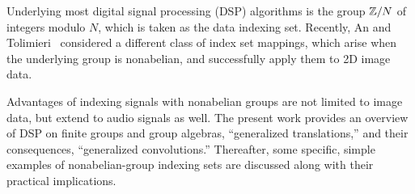 Underlying most digital signal processing (DSP) algorithms
is the group $\mathbb{Z}/N$ of integers modulo $N$, which is
taken as the data indexing set. 
Recently, An and
Tolimieri~\cite{An:2003} considered a different class of
index set mappings, which arise when the underlying group is
nonabelian, and successfully apply them to 2D image data. 

Advantages of indexing signals with nonabelian groups
are not limited to image data, but extend to audio signals
as well.  
The present work provides an overview of DSP on finite
groups and group algebras, 
``generalized translations,'' and their consequences, 
``generalized convolutions.'' Thereafter, some specific,
simple examples of nonabelian-group indexing sets 
are discussed along with their practical implications.


